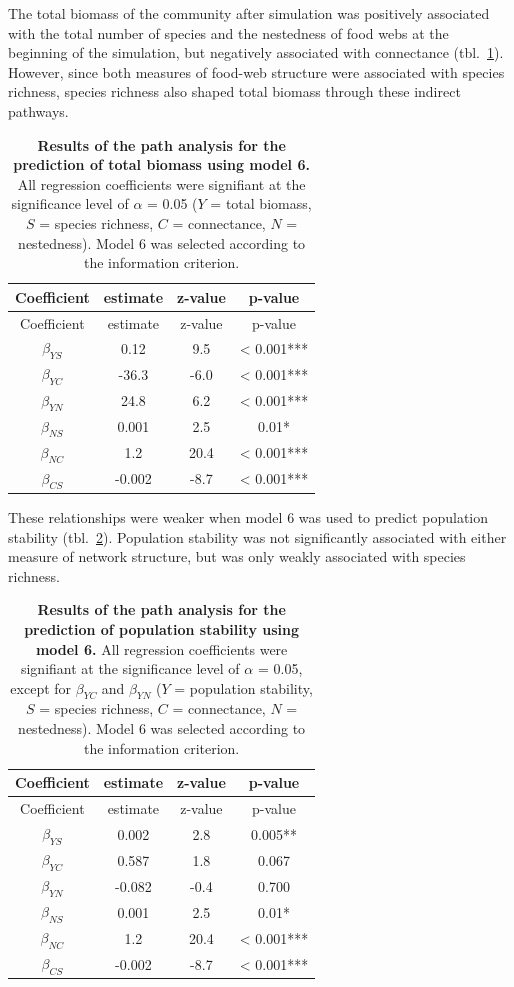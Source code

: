 \documentclass[10pt,oneside]{article}
\begin{document}
The total biomass of the community after simulation was positively
associated with the total number of species and the nestedness of food
webs at the beginning of the simulation, but negatively associated with
connectance (tbl.~\ref{tbl:path_biomass}). However, since both measures
of food-web structure were associated with species richness, species
richness also shaped total biomass through these indirect pathways.

\hypertarget{tbl:path_biomass}{}
\begin{longtable}[]{@{}cccc@{}}
\caption{\label{tbl:path_biomass}\textbf{Results of the path analysis
for the prediction of total biomass using model 6.} All regression
coefficients were signifiant at the significance level of \(\alpha\) =
0.05 (\(Y\) = total biomass, \(S\) = species richness, \(C\) =
connectance, \(N\) = nestedness). Model 6 was selected according to the
information criterion.}\tabularnewline
\toprule
Coefficient & estimate & z-value & p-value\tabularnewline
\midrule
\endfirsthead
\toprule
Coefficient & estimate & z-value & p-value\tabularnewline
\midrule
\endhead
\(\beta_{YS}\) & 0.12 & 9.5 & \textless{} 0.001***\tabularnewline
\(\beta_{YC}\) & -36.3 & -6.0 & \textless{} 0.001***\tabularnewline
\(\beta_{YN}\) & 24.8 & 6.2 & \textless{} 0.001***\tabularnewline
\(\beta_{NS}\) & 0.001 & 2.5 & 0.01*\tabularnewline
\(\beta_{NC}\) & 1.2 & 20.4 & \textless{} 0.001***\tabularnewline
\(\beta_{CS}\) & -0.002 & -8.7 & \textless{} 0.001***\tabularnewline
\bottomrule
\end{longtable}

These relationships were weaker when model 6 was used to predict
population stability (tbl.~\ref{tbl:path_stability}). Population
stability was not significantly associated with either measure of
network structure, but was only weakly associated with species richness.

\hypertarget{tbl:path_stability}{}
\begin{longtable}[]{@{}cccc@{}}
\caption{\label{tbl:path_stability}\textbf{Results of the path analysis
for the prediction of population stability using model 6.} All
regression coefficients were signifiant at the significance level of
\(\alpha\) = 0.05, except for \(\beta_{YC}\) and \(\beta_{YN}\) (\(Y\) =
population stability, \(S\) = species richness, \(C\) = connectance,
\(N\) = nestedness). Model 6 was selected according to the information
criterion.}\tabularnewline
\toprule
Coefficient & estimate & z-value & p-value\tabularnewline
\midrule
\endfirsthead
\toprule
Coefficient & estimate & z-value & p-value\tabularnewline
\midrule
\endhead
\(\beta_{YS}\) & 0.002 & 2.8 & 0.005**\tabularnewline
\(\beta_{YC}\) & 0.587 & 1.8 & 0.067\tabularnewline
\(\beta_{YN}\) & -0.082 & -0.4 & 0.700\tabularnewline
\(\beta_{NS}\) & 0.001 & 2.5 & 0.01*\tabularnewline
\(\beta_{NC}\) & 1.2 & 20.4 & \textless{} 0.001***\tabularnewline
\(\beta_{CS}\) & -0.002 & -8.7 & \textless{} 0.001***\tabularnewline
\bottomrule
\end{longtable}
\end{document}
